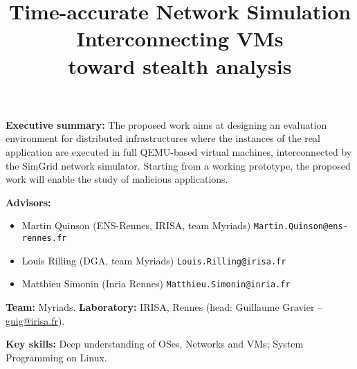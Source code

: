 \documentclass[a4paper,11pt]{article}
\begin{document}
\title{\vspace{-1.2cm}Time-accurate Network Simulation Interconnecting VMs \\ toward stealth analysis}
\author{}
\date{}

\maketitle

\vspace{-1.2cm}

\pagestyle{empty}
\thispagestyle{empty}

\noindent \textbf{Executive summary:} The proposed work aims at designing an evaluation environment
for distributed infrastructures where the instances of the real application are executed in full
QEMU-based virtual machines, interconnected by the SimGrid network simulator. Starting from a working
prototype, the proposed work will enable the study of malicious applications.

\noindent\textbf{Advisors:}\vspace{-.6\baselineskip}
\begin{itemize}
\item Martin Quinson (ENS-Rennes, IRISA, team Myriads)
  \texttt{Martin.Quinson@ens-rennes.fr}\vspace{-.5\baselineskip} 
\item Louis Rilling (DGA, team Myriads) \texttt{Louis.Rilling@irisa.fr} \vspace{-.5\baselineskip} 
\item Matthieu Simonin (Inria Rennes) \texttt{Matthieu.Simonin@inria.fr}
\end{itemize}\vspace{-.3\baselineskip}

\noindent\textbf{Team:} %
Myriads. \textbf{Laboratory:} IRISA, Rennes (head: Guillaume Gravier -- \url{guig@irisa.fr}).

\noindent \textbf{Key skills:} Deep understanding of OSes, Networks and VMs; System Programming on
Linux.
\end{document}
